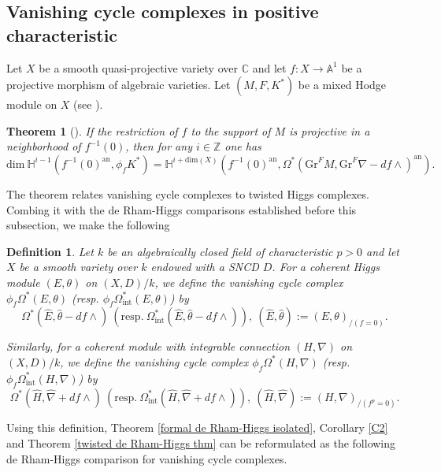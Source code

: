 \documentclass[12pt, a4paper]{article}
\newtheorem{definition}{Definition}[section]
\newtheorem{theorem}{Theorem}[section]
\begin{document}
\subsection{Vanishing cycle complexes in positive characteristic}
Let $X$ be a smooth quasi-projective variety over $\mathbb C$ and let $f:X\to\mathbb A^1$ be a projective morphism of algebraic varieties. Let $(M,F,K^*)$ be a mixed Hodge module on $X$ (see \cite[\S4]{Saito}). 
\begin{theorem}[{\cite[Theorem 2]{Sah1}}]
If the restriction of $f$ to the support of $M$ is projective in a neighborhood of $f^{-1}(0)$, then for any $i\in\mathbb Z$ one has
$$
\mathrm{dim}~\mathbb H^{i-1}(f^{-1}(0)^\mathrm{an},\phi_fK^*)=\mathbb H^{i+\mathrm{dim}(X)}(f^{-1}(0)^\mathrm{an}, \Omega^*(\mathrm{Gr}^FM,\mathrm{Gr}^F\nabla-df\wedge)^\mathrm{an}).
$$
\end{theorem}
The theorem relates vanishing cycle complexes to twisted Higgs complexes. 
Combing it with the de Rham-Higgs comparisons established before this subsection, we make the following
\begin{definition}
Let $k$ be an algebraically closed field of characteristic $p>0$ and let $X$ be a smooth variety over $k$ endowed with a SNCD $D$. For a coherent Higgs module $(E,\theta)$ on $(X,D)/k$, we define the vanishing cycle complex $\phi_f\Omega^*(E,\theta)$ (resp. $\phi_f\Omega_\mathrm{int}^*(E,\theta)$) by
$$
\Omega^*(\hat E,\hat\theta-df\wedge)~(\mathrm{resp.}~\Omega_\mathrm{int}^*(\hat E,\hat\theta-df\wedge)),~(\hat E,\hat\theta):=(E,\theta)_{/(f=0)}.
$$

Similarly, for a coherent module with integrable connection $(H,\nabla)$ on $(X,D)/k$, we define the vanishing cycle complex $\phi_f\Omega^*(H,\nabla)$ (resp. $\phi_f\Omega_\mathrm{int}^*(H,\nabla)$) by
$$
\Omega^*(\hat H,\hat\nabla+df\wedge)~(\mathrm{resp.}~\Omega^*_{\mathrm{int}}(\hat H,\hat\nabla+df\wedge)),~(\hat H,\hat\nabla):=(H,\nabla)_{/(f^p=0)}.
$$
\end{definition}
Using this definition, Theorem \ref{formal de Rham-Higgs isolated}, Corollary \ref{C2} and Theorem \ref{twisted de Rham-Higgs thm} can be reformulated as the following de Rham-Higgs comparison for vanishing cycle complexes.
\end{document}
